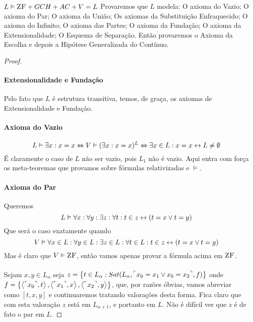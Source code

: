         \begin{theorem}{$L\vDash\text{\sc ZF}+GCH+AC+V=L$}
                Provaremos que $L$ modela: O axioma do Vazio; O axioma do Par; O axioma 
                da União; Os axiomas da Substituição Enfraquecido; O axioma do Infinito; 
                O axioma das Partes; O axioma da Fundação; O axioma da Extensionalidade;
                O Esquema de Separação. Então provaremos o Axioma da Escolha e depois a 
                Hipótese Generalizada do Contínuo.
            \begin{proof}
                \paragraph{Extensionalidade e Fundação}
                    Pelo fato que $L$ é estrutura transitiva, temos, de graça, os axiomas de 
                    Extensionalidade e Fundação.
                \paragraph{Axioma do Vazio}
                    $$L\vDash\exists x:x=x\Leftrightarrow V\vDash(\exists x:x=x)^L\Leftrightarrow\exists x\in L: x = x\leftrightarrow L\not = \emptyset$$
                    É claramente o caso de $L$ não ser vazio, pois $L_1$ não é vazio. Aqui entra com força os meta-teoremas 
                    que provamos sobre fórmulas relativizadas e $\vDash$.
                \paragraph{Axioma do Par}\nl
                    Queremos
                    $$L\vDash\forall x:\forall y:\exists z:\forall t: t\in z \leftrightarrow (t = x\lor t = y)$$
                    Que será o caso exatamente quando 
                    $$V\vDash\forall x\in L:\forall y\in L:\exists z\in L:\forall t\in L: t\in z \leftrightarrow (t = x\lor t = y) $$
                    Mas é claro que $V\vDash\text{\sc ZF}$, então vamos apenas provar a fórmula acima em $\text{\sc ZF}$.
                \paragraph{}
                    Sejam $x,y\in L_{\alpha}$ seja $z = \SET{t\in L_{\alpha}: Sat(L_\alpha, \FMLA{x_0 = x_1 \lor x_0 = x_2}, f)}$
                    onde $f=\SET{\TUPLE{\FMLA{x_0}}{t}}{\TUPLE{\FMLA{x_1}}{x}}{\TUPLE{\FMLA{x_2}}{y}}$, que, por razões óbvias, vamos 
                    abreviar como $[t,x,y]$ e continuaremos tratando valorações desta forma. Fica claro que com esta valoração 
                    $z$ está em $L_{\alpha+1}$, e portanto em $L$. Não é difícil ver que $z$ é de fato o par em $L$.

\end{proof}
\end{theorem}
